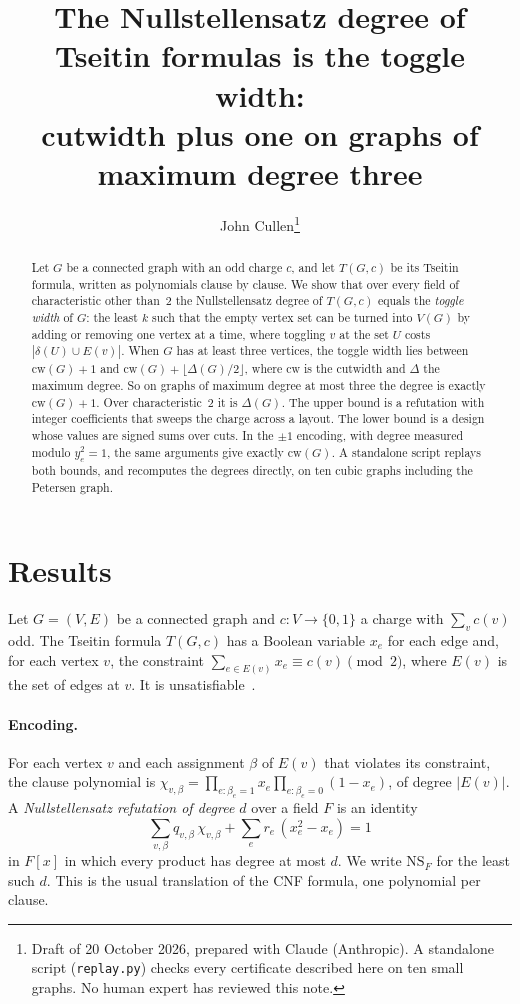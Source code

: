 \documentclass[11pt]{article}
\title{The Nullstellensatz degree of Tseitin formulas is the toggle width:\\
cutwidth plus one on graphs of maximum degree three}
\author{John Cullen\thanks{Draft of 20 October 2026, prepared with Claude
(Anthropic). A standalone script (\texttt{replay.py}) checks every certificate
described here on ten small graphs. No human expert has reviewed this note.}}
\date{}
\theoremstyle{definition}
\theoremstyle{remark}
\newcommand{\NS}{\mathrm{NS}}
\newcommand{\cw}{\mathrm{cw}}
\begin{document}
\maketitle

\begin{abstract}
Let $G$ be a connected graph with an odd charge $c$, and let $T(G,c)$ be its
Tseitin formula, written as polynomials clause by clause. We show that over
every field of characteristic other than~$2$ the Nullstellensatz degree of
$T(G,c)$ equals the \emph{toggle width} of $G$: the least $k$ such that the
empty vertex set can be turned into $V(G)$ by adding or removing one vertex at
a time, where toggling $v$ at the set $U$ costs $|\delta(U)\cup E(v)|$. When $G$
has at least three vertices, the toggle width lies between $\cw(G)+1$ and
$\cw(G)+\lfloor\Delta(G)/2\rfloor$, where $\cw$ is the cutwidth and $\Delta$ the
maximum degree. So on graphs of maximum degree at most three the degree is
exactly $\cw(G)+1$. Over characteristic~$2$ it is $\Delta(G)$. The upper bound is
a refutation with integer coefficients that sweeps the charge across a layout.
The lower bound is a design whose values are signed sums over cuts. In the
$\pm1$ encoding, with degree measured modulo $y_e^2=1$, the same arguments give
exactly $\cw(G)$. A standalone script replays both bounds, and recomputes the
degrees directly, on ten cubic graphs including the Petersen graph.
\end{abstract}

\section{Results}

Let $G=(V,E)$ be a connected graph and $c\colon V\to\{0,1\}$ a charge with
$\sum_v c(v)$ odd. The Tseitin formula $T(G,c)$ has a Boolean variable $x_e$
for each edge and, for each vertex $v$, the constraint
$\sum_{e\in E(v)}x_e\equiv c(v)\pmod 2$, where $E(v)$ is the set of edges at
$v$. It is unsatisfiable~\cite{Tse68}.

\paragraph{Encoding.} For each vertex $v$ and each assignment $\beta$ of $E(v)$
that violates its constraint, the clause polynomial is
$\chi_{v,\beta}=\prod_{e:\beta_e=1}x_e\prod_{e:\beta_e=0}(1-x_e)$, of degree
$|E(v)|$. A \emph{Nullstellensatz refutation of degree $d$} over a field $F$ is
an identity
\[
\textstyle\sum_{v,\beta}q_{v,\beta}\,\chi_{v,\beta}+\sum_e r_e\,(x_e^2-x_e)=1
\]
in $F[x]$ in which every product has degree at most $d$. We write $\NS_F$ for
the least such $d$. This is the usual translation of the CNF formula, one
polynomial per clause.
\end{document}
